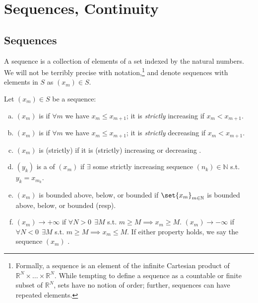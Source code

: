 \documentclass{article}
\begin{document}
\displayoptions

\section{Sequences, Continuity}
\label{sec:sequences_continuity}

\localtableofcontents

\subsection{Sequences}
\label{sub:sequences}

A sequence is a collection of elements of a set indexed by the natural numbers. We will not be terribly precise with notation,\footnote{Formally, a sequence is an element of the infinite Cartesian product of $\mathbb{R}^N \times \ldots \times \mathbb{R}^N$. While tempting to define a sequence as a countable or finite subset of $\mathbb{R}^N$, sets have no notion of order; further, sequences can have repeated elements.} and denote sequences with elements in $S$ as $(x_m) \in S$.
\begin{definition}
  Let $(x_m) \in S$ be a sequence:
  \begin{enumerate}[a)]
    \item $(x_m)$ is  if $\forall m$ we have $x_m \le x_{m + 1}$; it is \textit{strictly} increasing if $x_m < x_{m + 1}$.
    \item $(x_m)$ is  if $\forall m$ we have $x_m \le x_{m + 1}$; it is \textit{strictly} decreasing if $x_m < x_{m + 1}$.
    \item $(x_m)$ is (strictly)  if it is (strictly) increasing or decreasing .
    \item $(y_k)$ is a  of $(x_m)$ if $\exists$ some strictly increasing sequence $(n_k) \in \mathbb{N}$ s.t. $y_k = x_{m_k}$.
    \item $(x_m)$ is bounded above, below, or bounded if $\set{x_m}_{m \in \mathbb{N}}$ is bounded above, below, or bounded (resp).
    \item $(x_m) \to +\infty$ if $\forall N > 0 ~~ \exists M$ s.t. $m \ge M \implies x_m \ge M$.  $(x_m) \to -\infty$ if $\forall N < 0 ~~ \exists M$ s.t. $m \ge M \implies x_m \le M$. If either property holds, we say the sequence $(x_m)$ .
  \end{enumerate}
\end{definition}
\end{document}
